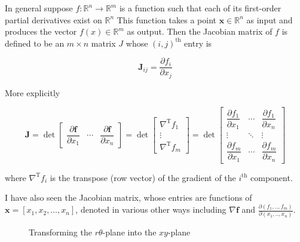 \documentclass{article}
\theoremstyle{definition}
\begin{document}
\bigskip
\noindent
In general suppose $f: \mathbb{R}^{n} \to \mathbb{R}^{m}$ is a
function such that each of its first-order partial derivatives
exist on $\mathbb{R}^{n}$ This function takes a point $\mathbf{x}
\in \mathbb{R}^{n}$ as input and produces the vector $f(x) \in
\mathbb{R}^{m}$ as output. Then the Jacobian matrix of $f$ is
defined to be an $m \times n$ matrix $J$ whose $(i,j)^\text{th}$
entry is

\begin{equation*}
\mathbf{J}_{ij} = \frac {\partial f_{i}}{\partial x_{j}}
\end{equation*}

\noindent
More explicitly

\begin{equation*}
{\displaystyle \mathbf {J} 
={\det \begin{bmatrix}
 {\dfrac {\partial \mathbf {f} }{\partial x_{1}}} &\cdots & {\dfrac {\partial \mathbf {f} }{\partial x_{n}}}
 \end{bmatrix}}
={\det \begin{bmatrix}
   \nabla ^{\mathrm {T} }f_{1}\\\vdots \\\nabla ^{\mathrm {T} }f_{m}
   \end{bmatrix}}
={\det \begin{bmatrix}
 {\dfrac {\partial f_{1}}{\partial x_{1}}} & \cdots & {\dfrac {\partial f_{1}}{\partial x_{n}}}\\
 \vdots &\ddots &\vdots \\
 {\dfrac {\partial f_{m}}{\partial x_{1}}} & \cdots & {\dfrac {\partial f_{m}}{\partial x_{n}}}
 \end{bmatrix}}}
\end{equation*}

\bigskip
\noindent
where $\nabla^{\mathrm {T} }f_{i}$ is the transpose (row vector)
of the gradient of the $i^{\text{th}}$ component. 


\noindent
I have also seen the Jacobian matrix, whose entries are functions
of $\mathbf{x} = [x_1,x_2,\hdots, x_n]$, denoted in various other
ways including ${\displaystyle \nabla \mathbf {f}}$ and
${\displaystyle {\frac {\partial (f_{1},..,f_{m})}{\partial
(x_{1},..,x_{n})}}}$.


\begin{figure}[t]
\caption{Transforming the $r\theta$-plane into the $xy$-plane}
\label{fig:r_theta_to_x_y}
\end{figure}
\end{document}

